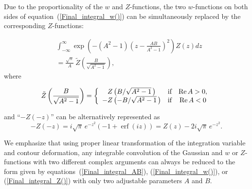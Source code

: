 \documentclass[draft]{agujournal2019}
\begin{document}
{Due to the proportionality of the $w$ and $Z$-functions, 
the two $w$-functions on both sides of equation~(\ref{Final_integral_w()}) can be
simultaneously replaced by the corresponding $Z$-functions:
\begin{linenomath*}
\begin{align}
& \int_{-\infty}^{\infty}\exp\left(  -(A^{2}-1)\left(  z-\frac{AB}{A^{2}%
-1}\right)  ^{2}\right)  Z(z)dz\nonumber\\
& =\frac{\sqrt{\pi}}{A}\ \tilde{Z}\left(  \frac{B}{\sqrt{A^{2}-1}}\right),
\label{Final_integral_Z()}%
\end{align}
where
\begin{linenomath*}
\begin{equation}
\tilde{Z}\left(  \frac{B}{\sqrt{A^{2}-1}}\right)  =\left\{
\begin{array}
[c]{ccc}%
Z\left(  {B}/{\sqrt{A^{2}-1}}\,\right)   & \text{if} & \operatorname{Re}%
A>0,\\
-Z\left(  - {B}/{\sqrt{A^{2}-1}}\,\right)   & \text{if} & \operatorname{Re}A<0
\label{tilde_Z}
\end{array}
\right.
\end{equation}
\end{linenomath*}
and ``$-Z(-z)$'' can be alternatively represented as
\begin{equation*}
-Z(-z)=i\sqrt{\pi}\,e^{-z^{2}}(-1+\operatorname{erf}(iz))
=Z(z)-2i\sqrt{\pi}\,e^{-z^{2}}.
\end{equation*}
\end{linenomath*}

We emphasize that using proper linear transformation of the integration
variable and contour deformation, any integrable convolution of the Gaussian and $w$ or $Z$-functions
with two different complex arguments can always be reduced to the form given by
equations~(\ref{Final_integral_AB}), (\ref{Final_integral_w()}), or (\ref{Final_integral_Z()}) with only two adjustable
parameters $A$ and $B$.

}
\end{document}
